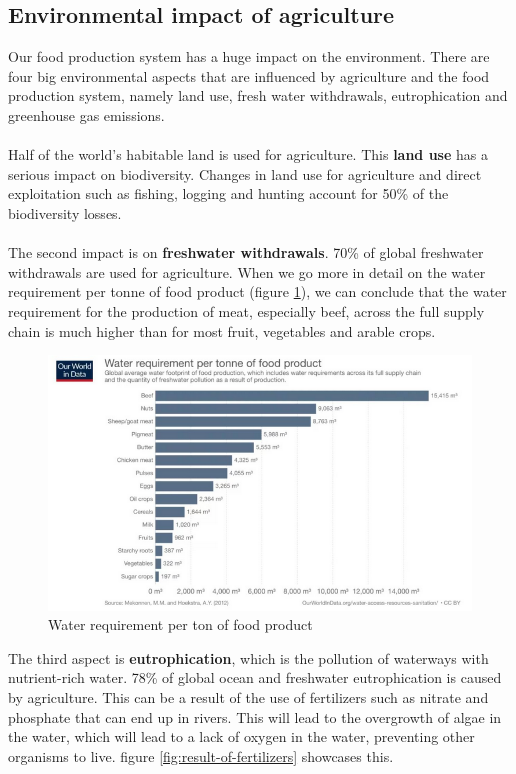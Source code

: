 \documentclass[../summary.tex]{subfiles}
\begin{document}
	\subsection{Environmental impact of agriculture}
	
	Our food production system has a huge impact on the environment. There are four big environmental aspects that are influenced by agriculture and the food production system, namely land use, fresh water withdrawals, eutrophication and greenhouse gas emissions.
	\\\\
	Half of the world’s habitable land is used for agriculture. This \textbf{land use} has a serious impact on biodiversity. Changes in land use for agriculture and direct exploitation such as fishing, logging and hunting account for 50\% of the biodiversity losses. 
	\\\\
	The second impact is on \textbf{freshwater withdrawals}. 70\% of global freshwater withdrawals are used for agriculture. When we go more in detail on the water requirement per tonne of food product (figure \ref{fig:production-water-requirement}), we can conclude that the water requirement for the production of meat, especially beef, across the full supply chain is much higher than for most fruit, vegetables and arable crops.
	\\
	
	\begin{figure} [htbp]
		\centering
		\includegraphics[width=1\linewidth]{images/6-product-water-requirement.png}
		\caption{Water requirement per ton of food product}
		\label{fig:production-water-requirement}
	\end{figure}
	
	The third aspect is \textbf{eutrophication}, which is the pollution of waterways with nutrient-rich water. 78\% of global ocean and freshwater eutrophication is caused by agriculture. This can be a result of the use of fertilizers such as nitrate and phosphate that can end up in rivers. This will lead to the overgrowth of algae in the water, which will lead to a lack of oxygen in the water, preventing other organisms to live. figure \ref{fig:result-of-fertilizers} showcases this.
	
\end{document}
